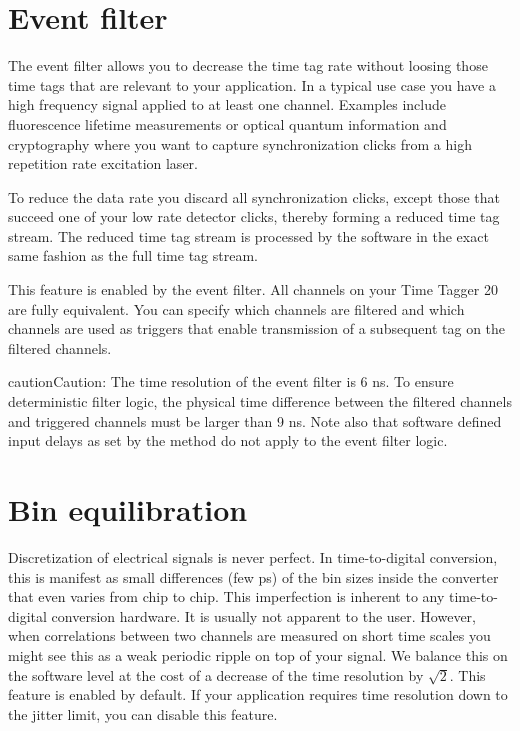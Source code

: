 \documentclass[letterpaper,10pt,english]{sphinxmanual}
\begin{document}
\section{Event filter}
\label{sections/hardware:event-filter}
The event filter allows you to decrease the time tag rate without loosing
those time tags that are relevant to your application. In a typical use case
you have a high frequency signal applied to at least one channel. Examples
include fluorescence lifetime measurements or optical quantum information
and cryptography where you want to capture synchronization clicks
from a high repetition rate excitation laser.

To reduce the data rate you discard all synchronization clicks, except
those that succeed one of your low rate detector clicks, thereby forming
a reduced time tag stream. The reduced time tag stream is processed
by the software in the exact same fashion as the full time tag stream.

This feature is enabled by the event filter. All channels on your
Time Tagger 20 are fully equivalent. You can specify which channels
are filtered and which channels are used as triggers that enable
transmission of a subsequent tag on the filtered channels.

\begin{notice}{caution}{Caution:}
The time resolution of the event filter is 6 ns. To ensure
deterministic filter logic, the physical time difference between
the filtered channels and triggered channels must be
larger than 9 ns. Note also that software defined input
delays as set by the method 
do not apply to the event filter logic.
\end{notice}


\section{Bin equilibration}
\label{sections/hardware:bin-equilibration}
Discretization of electrical signals is never perfect. In time-to-digital conversion, this is manifest
as small differences (few ps) of the bin sizes inside the converter that even varies from chip to chip.
This imperfection is inherent to any time-to-digital conversion hardware.
It is usually not apparent to the user. However, when correlations between two channels are measured on short
time scales you might see this as a weak periodic ripple on top of your signal.
We balance this on the software level at the cost of a decrease of
the time resolution by \(\sqrt{2}\). This feature is enabled by default.
If your application requires time resolution down to the jitter limit,
you can disable this feature.
\end{document}
